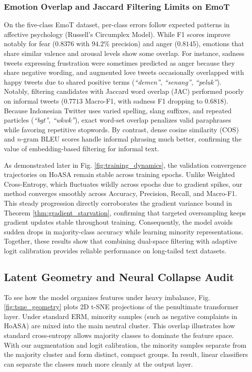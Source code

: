 \documentclass[10pt,journal,compsoc]{IEEEtran}
\begin{document}
\subsubsection{Emotion Overlap and Jaccard Filtering Limits on EmoT}
\label{subsubsec:emot_overlap}
On the five-class EmoT dataset, per-class errors follow expected patterns in affective psychology (Russell's Circumplex Model). While F1 scores improve notably for fear ($0.8376$ with $94.2\%$ precision) and anger ($0.8145$), emotions that share similar valence and arousal levels show some overlap. For instance, sadness tweets expressing frustration were sometimes predicted as anger because they share negative wording, and augmented love tweets occasionally overlapped with happy tweets due to shared positive terms (\textit{``demen''}, \textit{``senang''}, \textit{``peluk''}). Notably, filtering candidates with Jaccard word overlap (JAC) performed poorly on informal tweets ($0.7713$ Macro-F1, with sadness F1 dropping to $0.6818$). Because Indonesian Twitter uses varied spelling, slang suffixes, and repeated particles (\textit{``bgt''}, \textit{``wkwk''}), exact word-set overlap penalizes valid paraphrases while favoring repetitive stopwords. By contrast, dense cosine similarity (COS) and $n$-gram BLEU scores handle informal phrasing much better, confirming the value of embedding-based filtering for informal text.

As demonstrated later in Fig. \ref{fig:training_dynamics}, the validation convergence trajectories on HoASA remain stable across training epochs. Unlike Weighted Cross-Entropy, which fluctuates wildly across epochs due to gradient spikes, our method converges smoothly across Accuracy, Precision, Recall, and Macro-F1. This steady progression directly corroborates the gradient variance bound in Theorem \ref{thm:gradient_starvation}, confirming that targeted oversampling keeps gradient updates stable throughout training. Consequently, the model avoids sudden drops in majority-class accuracy while learning minority representations. Together, these results show that combining dual-space filtering with adaptive logit calibration provides reliable performance on long-tailed text datasets.

\subsection{Latent Geometry and Neural Collapse Audit}
\label{subsec:latent_geometry}

To see how the model organizes features under heavy imbalance, Fig. \ref{fig:tsne_geometry} plots 2D t-SNE projections of the penultimate transformer layer. Under standard ERM, minority samples (such as negative complaints in HoASA) are mixed into the main neutral cluster. This overlap illustrates how standard cross-entropy allows majority classes to dominate the feature space. With our augmentation and logit calibration, the minority samples separate from the majority cluster and form distinct, compact groups. In result, linear classifiers can separate the classes much more cleanly at the output layer.
\end{document}
